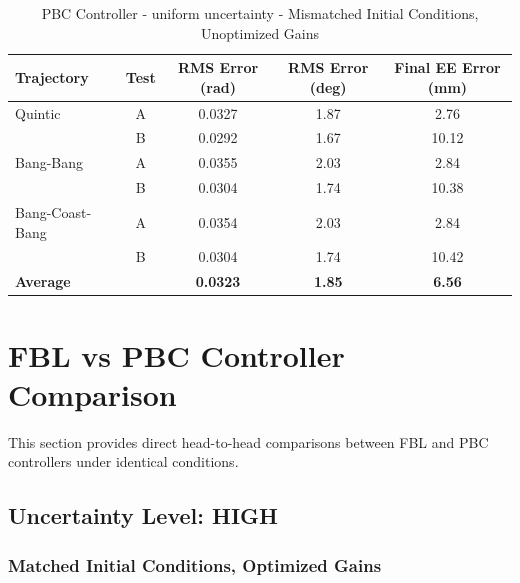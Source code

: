\documentclass[11pt,a4paper]{article}
\begin{document}
\begin{table}[H]
\centering
\caption{PBC Controller - uniform uncertainty - Mismatched Initial Conditions, Unoptimized Gains}
\begin{tabular}{lcccc}
\toprule
Trajectory & Test & RMS Error (rad) & RMS Error (deg) & Final EE Error (mm) \\
\midrule
Quintic & A & 0.0327 & 1.87 & 2.76 \\
 & B & 0.0292 & 1.67 & 10.12 \\
\midrule
Bang-Bang & A & 0.0355 & 2.03 & 2.84 \\
 & B & 0.0304 & 1.74 & 10.38 \\
\midrule
Bang-Coast-Bang & A & 0.0354 & 2.03 & 2.84 \\
 & B & 0.0304 & 1.74 & 10.42 \\
\midrule
\textbf{Average} & & \textbf{0.0323} & \textbf{1.85} & \textbf{6.56} \\
\bottomrule
\end{tabular}
\end{table}

\section{FBL vs PBC Controller Comparison}

This section provides direct head-to-head comparisons between FBL and PBC controllers under identical conditions.

\subsection{Uncertainty Level: HIGH}

\subsubsection{Matched Initial Conditions, Optimized Gains}
\end{document}
